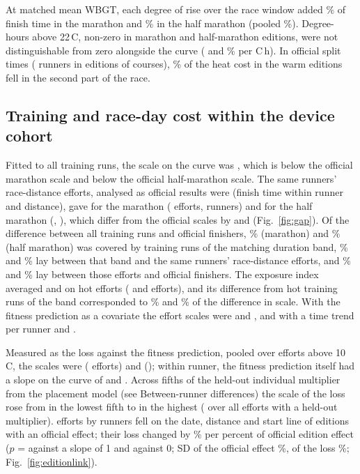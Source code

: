\documentclass[12pt]{article}
\newcommand{\degC}{\,\textdegree C}
\begin{document}
At matched mean WBGT, each degree of rise over the race window added \riseMar\% of finish time in the marathon and \riseHalf\% in the half marathon (pooled \risePooled\%). Degree-hours above 22\degC, non-zero in \nDhMar{} marathon and \nDhHalf{} half-marathon editions, were not distinguishable from zero alongside the curve (\dhMar{} and \dhHalf\% per \textdegree C\,h). In official split times (\nSplitRunners{} runners in \nSplitEd{} editions of \nSplitCourses{} courses), \lateShare\% of the heat cost in the \nSplitWarm{} warm editions fell in the second part of the race.

\subsection{Training and race-day cost within the device cohort}
Fitted to all training runs, the scale on the curve was \gapTrainAll, which is \gapUnitsMar{} below the official marathon scale and \gapUnitsHalf{} below the official half-marathon scale. The same runners' race-distance efforts, analysed as official results were (finish time within runner and distance), gave \gapPlatMar{} for the marathon (\gapPlatMarN{} efforts, \gapPlatMarRunners{} runners) and \gapPlatHalf{} for the half marathon (\gapPlatHalfN, \gapPlatHalfRunners), which differ from the official scales by \gapPlatMinusOffMar{} and \gapPlatMinusOffHalf{} (Fig.~\ref{fig:gap}). Of the difference between all training runs and official finishers, \gapShareDurMar\% (marathon) and \gapShareDurHalf\% (half marathon) was covered by training runs of the matching duration band, \gapShareRaceMar\% and \gapShareRaceHalf\% lay between that band and the same runners' race-distance efforts, and \gapSharePlatMar\% and \gapSharePlatHalf\% lay between those efforts and official finishers. The exposure index averaged \gapIndexHotMar{} and \gapIndexHotHalf{} on hot efforts (\gapHotEffortsMar{} and \gapHotEffortsHalf{} efforts), and its difference from hot training runs of the band corresponded to \gapShareAccMar\% and \gapShareAccHalf\% of the difference in scale. With the fitness prediction as a covariate the effort scales were \gapPlatPredMar{} and \gapPlatPredHalf, and with a time trend per runner \gapPlatTrendMar{} and \gapPlatTrendHalf.

Measured as the loss against the fitness prediction, pooled over efforts above 10\degC, the scales were \gapPredMar{} (\gapPredNMar{} efforts) and \gapPredHalf{} (\gapPredNHalf); within runner, the fitness prediction itself had a slope on the curve of \gapPredSlopeMar{} and \gapPredSlopeHalf. Across fifths of the held-out individual multiplier from the placement model (see Between-runner differences) the scale of the loss rose from \gapFifthLow{} in the lowest fifth to \gapFifthHigh{} in the highest (\gapEffortsPooled{} over all efforts with a held-out multiplier). \edlEfforts{} efforts by \edlRunners{} runners fell on the date, distance and start line of \edlEditions{} editions with an official effect; their loss changed by \edlSlope\% per percent of official edition effect ($p$ = \edlPOne{} against a slope of 1 and \edlPZero{} against 0; SD of the official effect \edlSDOfficial\%, of the loss \edlSDPlatform\%; Fig.~\ref{fig:editionlink}).
\end{document}
